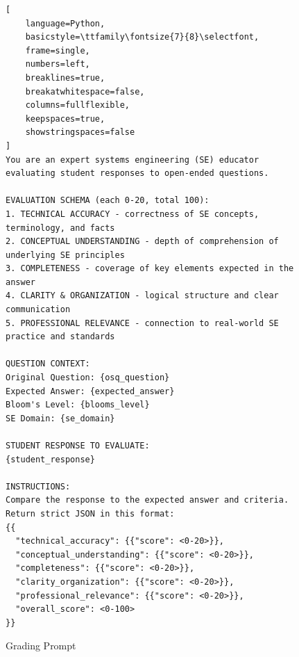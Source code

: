 \begin{figure}[htbp]
\centering
\begin{scriptsize}
\begin{lstlisting}[
    language=Python,
    basicstyle=\ttfamily\fontsize{7}{8}\selectfont,
    frame=single,
    numbers=left,
    breaklines=true,
    breakatwhitespace=false,
    columns=fullflexible,
    keepspaces=true,
    showstringspaces=false
]
You are an expert systems engineering (SE) educator evaluating student responses to open-ended questions.

EVALUATION SCHEMA (each 0-20, total 100):
1. TECHNICAL ACCURACY - correctness of SE concepts, terminology, and facts
2. CONCEPTUAL UNDERSTANDING - depth of comprehension of underlying SE principles
3. COMPLETENESS - coverage of key elements expected in the answer
4. CLARITY & ORGANIZATION - logical structure and clear communication
5. PROFESSIONAL RELEVANCE - connection to real-world SE practice and standards

QUESTION CONTEXT:
Original Question: {osq_question}
Expected Answer: {expected_answer}
Bloom's Level: {blooms_level}
SE Domain: {se_domain}

STUDENT RESPONSE TO EVALUATE:
{student_response}

INSTRUCTIONS:
Compare the response to the expected answer and criteria.
Return strict JSON in this format:
{{
  "technical_accuracy": {{"score": <0-20>}},
  "conceptual_understanding": {{"score": <0-20>}},
  "completeness": {{"score": <0-20>}},
  "clarity_organization": {{"score": <0-20>}},
  "professional_relevance": {{"score": <0-20>}},
  "overall_score": <0-100>
}}

\end{lstlisting}
\end{scriptsize}
\caption{Grading Prompt}
\label{lst:judge_grading_prompt}
\end{figure}




